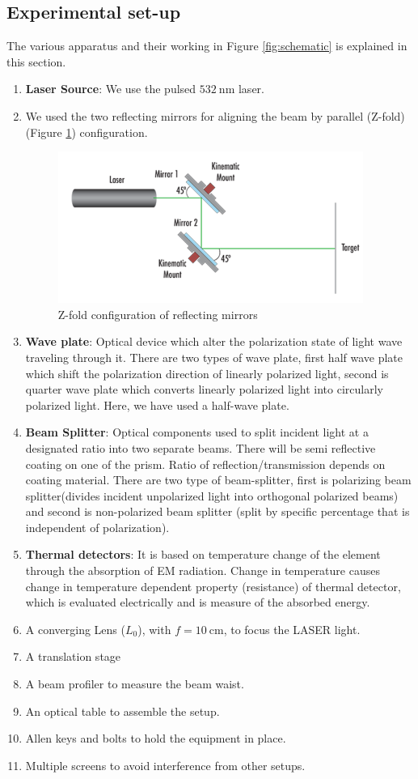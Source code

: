 \documentclass[%
 reprint,
 amsmath,amssymb,
 aps,
]{revtex4-2}
\begin{document}
	\subsection{Experimental set-up}
	The various apparatus and their working in Figure \ref{fig:schematic} is explained in this section.
	\begin{enumerate}
		\item \textbf{Laser Source}: We
		use
		the
		pulsed $ \SI{532}{\nano \meter} $ laser.
		\item We used the two reflecting mirrors for aligning the beam by
		parallel
		(Z-fold) (Figure \ref{fig:zfold})
		configuration.
		\begin{figure}
			\includegraphics{zfold}
			\caption{Z-fold configuration of  reflecting mirrors}
			\label{fig:zfold}
		\end{figure}
		\item \textbf{Wave plate}:
		Optical device
		which alter the polarization
		state of light wave traveling
		through it. There are two types
		of wave plate, first half wave
		plate which shift the polarization direction of linearly polarized light, second is quarter
		wave plate which converts linearly polarized light into circularly polarized light. Here, we have used a half-wave plate.
		\item \textbf{Beam Splitter}:
		Optical components used to split incident light at a designated ratio into
		two separate beams.
		There
		will be semi reflective coating
		on one of the prism.
		Ratio of reflection/transmission
		depends on coating material.
		There are two type of beam-splitter, first is polarizing beam
		splitter(divides incident unpolarized light into orthogonal
		polarized beams) and second
		is non-polarized beam splitter (split by specific percentage
		that is independent of polarization).
		\item\textbf{ Thermal detectors}: It is based
		on temperature change of the element through the absorption of EM radiation. Change
		in temperature causes change
		in
		temperature
		dependent
		property (resistance) of thermal detector, which is evaluated electrically and is measure
		of the absorbed energy.
		\item A converging Lens ($ L_0 $), with
		$ f = \SI{10}{\centi \metre} $, to focus the LASER
		light.
		\item A translation stage
		\item A beam profiler to measure the
		beam waist.
		\item An optical table to assemble
		the setup.
		\item Allen keys and bolts to hold
		the equipment in place.
		\item Multiple screens to avoid interference from other setups.
	\end{enumerate}
\end{document}
